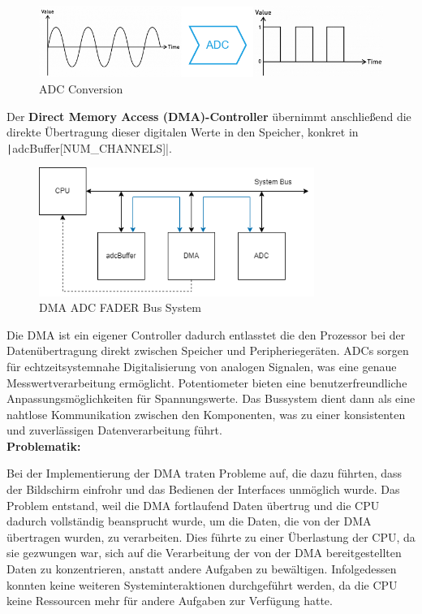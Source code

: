 \begin{figure}[H]
	\centering
	\includegraphics[width=1.0\textwidth]{images/08_durchfuehrung/interface/Conversion.drawio.png}
	\caption{ADC Conversion}
	\label{fig:conversion}
\end{figure}

Der \textbf{Direct Memory Access (DMA)-Controller} übernimmt anschließend die direkte Übertragung dieser digitalen Werte in den Speicher, konkret in  \texttt|adcBuffer[NUM_CHANNELS]|.

\begin{figure}[H]
\centering
\includegraphics[width=0.8\textwidth]{images/08_durchfuehrung/interface/DMA_ADC_MEM.drawio.png}
\caption{DMA ADC FADER Bus System}
\label{fig:DMA ADC FADER}
\end{figure}

Die DMA ist ein eigener Controller dadurch entlasstet die den Prozessor bei der Datenübertragung direkt zwischen Speicher und Peripheriegeräten.
ADCs sorgen für echtzeitsystemnahe Digitalisierung von analogen Signalen, was eine genaue Messwertverarbeitung ermöglicht. Potentiometer bieten eine benutzerfreundliche Anpassungsmöglichkeiten für Spannungswerte. Das Bussystem dient dann als eine nahtlose Kommunikation zwischen den Komponenten, was zu einer konsistenten und zuverlässigen Datenverarbeitung führt.\\

\textbf{Problematik:}

Bei der Implementierung der DMA traten Probleme auf, die dazu führten, dass der Bildschirm einfrohr und das Bedienen der Interfaces unmöglich wurde. Das Problem entstand, weil die DMA fortlaufend Daten übertrug und die CPU dadurch vollständig beansprucht wurde, um die Daten, die von der DMA übertragen wurden, zu verarbeiten. Dies führte zu einer Überlastung der CPU, da sie gezwungen war, sich auf die Verarbeitung der von der DMA bereitgestellten Daten zu konzentrieren, anstatt andere Aufgaben zu bewältigen. Infolgedessen konnten keine weiteren Systeminteraktionen durchgeführt werden, da die CPU keine Ressourcen mehr für andere Aufgaben zur Verfügung hatte.

